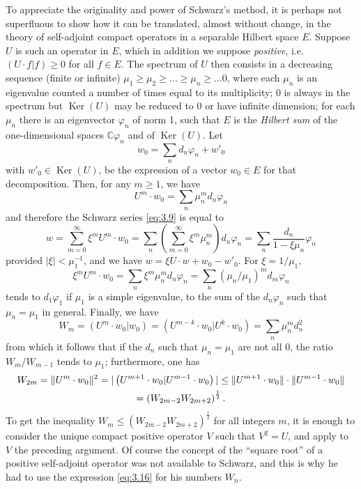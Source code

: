 \documentclass[12pt,a4paper,leqno,twoside]{extbook}
\DeclarePairedDelimiter{\norm}{\lVert}{\rVert}
\newcommand{\C}{\mathbb{C}}
\newcommand{\Ker}{\operatorname{Ker}}
\begin{document}
To appreciate the originality and power of Schwarz's method, it is perhaps not superfluous to show how it can be translated, almost without change, in the theory of self-adjoint compact operators in a separable Hilbert space \(E\). Suppose \(U\) is such an operator in \(E\), which in addition we suppose \emph{positive}, i.e. \((U\cdot f| f) \geq 0\) for all \(f \in E\). The spectrum of \(U\) then consists in a decreasing sequence (finite or infinite) \(\mu_1 \geq \mu_2 \geq \ldots \geq \mu_n \geq \ldots 0\), where each \(\mu_n\) is an eigenvalue counted a number of times equal to its multiplicity; 0 is always in the spectrum but \(\Ker(U)\) may be reduced to 0 or have infinite dimension; for each \(\mu_n\) there is an eigenvector \(\varphi_n\) of norm 1, such that \(E\) is the \emph{Hilbert sum} of the one-dimensional spaces \(\C \varphi_n\) and of \(\Ker(U)\). Let
\[
    w_0 = \sum_n d_n \varphi_n + w'_0
\]
with \(w'_0 \in \Ker(U)\), be the expression of a vector \(w_0 \in E\) for that decomposition. Then, for any \(m \geq 1\), we have
\[
    U^m \cdot w_0 = \sum_n \mu^m_n d_n \varphi_n
\]
and therefore the Schwarz series \eqref{eq:3.9} is equal to
\[
    w = \sum_{m=0}^\infty \xi^m U^m \cdot w_0 = \sum_n \left( \sum_{m=0}^\infty \xi^m \mu^m_n \right) d_n \varphi_n = \sum_n \frac{d_n}{1 - \xi \mu_n} \varphi_n
\]
provided \(|\xi| < \mu_1^{-1}\), and we have \(w = \xi U \cdot w + w_0 - w'_0\). For \(\xi = 1/\mu_1\),
\[
    \xi^m U^m \cdot w_0 = \sum_n \xi^m \mu^m_n d_n \varphi_n = \sum_n \left( \mu_n / \mu_1 \right)^m d_m \varphi_n
\]
tends to \(d_1 \varphi_1\) if \(\mu_1\) is a simple eigenvalue, to the sum of the \(d_n \varphi_n\) such that \(\mu_n = \mu_1\) in general. Finally, we have
\[
    W_m = \left( U^m \cdot w_0 | w_0 \right) = \left( U^{m-k} \cdot w_0 | U^k \cdot w_0 \right) = \sum_n \mu^m_n d^2_n
\]
from which it follows that if the \(d_n\) such that \(\mu_n = \mu_1\) are not all 0, the ratio \(W_m / W_{m-1}\) tends to \(\mu_1\); furthermore, one has
\[
    \begin{gathered}
        W_{2m} = \norm{U^m \cdot w_0}^2 = |\left( U^{m+1} \cdot w_0 | U^{m-1} \cdot w_0 \right)| \leq \norm{U^{m+1} \cdot w_0} \cdot \norm{U^{m-1} \cdot w_0} \\
        = \left( W_{2m-2} W_{2m+2} \right)^\frac{1}{2}.
    \end{gathered}
\]
To get the inequality \(W_m \leq \left( W_{2m-2} W_{2m+2} \right)^\frac{1}{2}\) for all integers \(m\), it is enough to consider the unique compact positive operator \(V\) such that \(V^2 = U\), and apply to \(V\) the preceding argument. Of course the concept of the ``square root'' of a positive self-adjoint operator was not available to Schwarz, and this is why he had to use the expression \eqref{eq:3.16} for his numbers \(W_n\).
\end{document}
